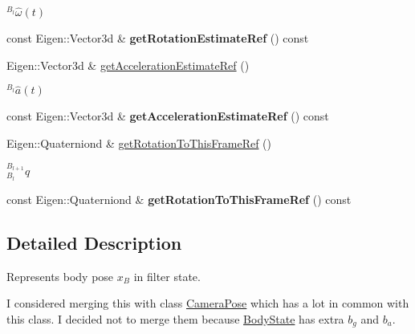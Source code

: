 \begin{DoxyCompactItemize}
\begin{DoxyCompactList}\small\item\em $ {}^{B_{l}}\hat{\omega}(t) $ \end{DoxyCompactList}\item 
\hypertarget{class_body_state_a5fa70b22c29e49df42edfc6ff27512e4}{const Eigen\-::\-Vector3d \& {\bfseries get\-Rotation\-Estimate\-Ref} () const }\label{class_body_state_a5fa70b22c29e49df42edfc6ff27512e4}

\item 
\hypertarget{class_body_state_a9eb0e9ec3ae23769abf50f6e75777cd7}{Eigen\-::\-Vector3d \& \hyperlink{class_body_state_a9eb0e9ec3ae23769abf50f6e75777cd7}{get\-Acceleration\-Estimate\-Ref} ()}\label{class_body_state_a9eb0e9ec3ae23769abf50f6e75777cd7}

\begin{DoxyCompactList}\small\item\em $ {}^{B_{l}}\hat{a}(t) $ \end{DoxyCompactList}\item 
\hypertarget{class_body_state_a169ebe4343b2d213badaa69208cc2eed}{const Eigen\-::\-Vector3d \& {\bfseries get\-Acceleration\-Estimate\-Ref} () const }\label{class_body_state_a169ebe4343b2d213badaa69208cc2eed}

\item 
\hypertarget{class_body_state_a1589f0e96fcf159b77f385157665ef7b}{Eigen\-::\-Quaterniond \& \hyperlink{class_body_state_a1589f0e96fcf159b77f385157665ef7b}{get\-Rotation\-To\-This\-Frame\-Ref} ()}\label{class_body_state_a1589f0e96fcf159b77f385157665ef7b}

\begin{DoxyCompactList}\small\item\em $ {}_{B_l}^{B_{l+1}}q $ \end{DoxyCompactList}\item 
\hypertarget{class_body_state_a482c8b749617c7df011c29f64183db38}{const Eigen\-::\-Quaterniond \& {\bfseries get\-Rotation\-To\-This\-Frame\-Ref} () const }\label{class_body_state_a482c8b749617c7df011c29f64183db38}

\end{DoxyCompactItemize}


\subsection{Detailed Description}
Represents body pose $x_B$ in filter state. 

I considered merging this with class \hyperlink{class_camera_pose}{Camera\-Pose} which has a lot in common with this class. I decided not to merge them because \hyperlink{class_body_state}{Body\-State} has extra $b_g$ and $b_a$. 

